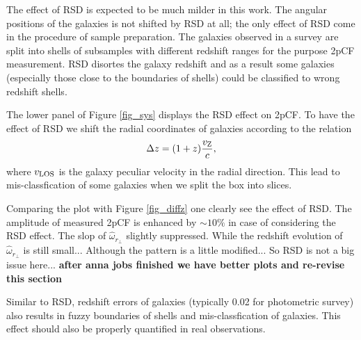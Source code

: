 \documentclass[iop]{emulateapj}
\begin{document}
The effect of RSD is expected to be much milder in this work. 
The angular positions of the galaxies is not shifted by RSD at all;
the only effect of RSD come in the procedure of sample preparation. %
The galaxies observed in a survey are split into shells of subsamples with different redshift ranges for the purpose 2pCF measurement.
RSD disortes the galaxy redshift and as a result some galaxies (especially those close to the boundaries of shells) could be classified to wrong redshift shells.

The lower panel of Figure \ref{fig_sys} displays the RSD effect on 2pCF.
To have the effect of RSD we shift the radial coordinates of galaxies according to the relation 
\begin{equation}\label{eq:zvpeu}
\Delta z = (1+z) \frac{v_{{\rm Z}}}{c},
\end{equation}
where $v_{{\rm LOS}}$ is the galaxy peculiar velocity in the radial direction.
This lead to mis-classfication of some galaxies when we split the box into slices.

Comparing the plot with Figure \ref{fig_diffz} one clearly see the effect of RSD.
The amplitude of measured 2pCF is enhanced by $\sim 10\%$ in case of considering the RSD effect.
The slop of $\hat\omega_{r_\perp}$ slightly suppressed.
While the redshift evolution of $\hat\omega_{r_\perp}$ is still small...
Although the pattern is a little modified...
So RSD is not a big issue here... {\bf after anna jobs finished we have better plots and re-revise this section }

Similar to RSD, redshift errors of galaxies (typically 0.02 for photometric survey) also results in fuzzy boundaries of shells and mis-classfication of galaxies.
This effect should also be properly quantified in real observations.

\end{document}
